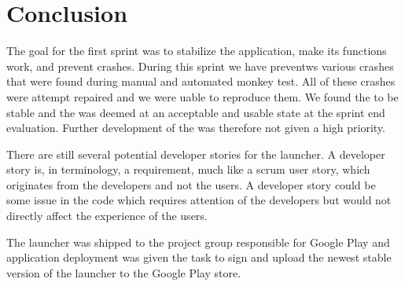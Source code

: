 
\chapter{Conclusion}
\label{cha:conclusion}

The goal for the first sprint was to stabilize the \launcher application, make its functions work, and prevent crashes. During this sprint we have preventws various crashes that were found during manual and automated monkey test. All of these crashes were attempt repaired and we were uable to reproduce them. We found the \launcher to be stable and the \launcher was deemed at an acceptable and usable state at the sprint end evaluation. Further development of the \launcher was therefore not given a high priority. 

There are still several potential developer stories for the launcher. A developer story is, in \giraf terminology, a requirement, much like a scrum user story, which originates from the developers and not the users. A developer story could be some issue in the code which requires attention of the developers but would not directly affect the experience of the users.   


The launcher was shipped to the project group responsible for Google Play and application deployment was given the task to sign and upload the newest stable version of the launcher to the Google Play store. 






